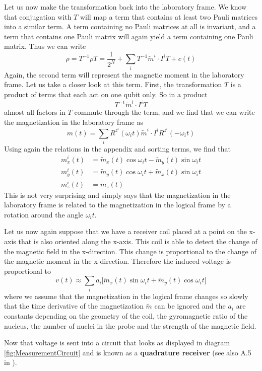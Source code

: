 \documentclass[a4paper, draft]{article}
\theoremstyle{own}
\theoremstyle{remark}
\begin{document}
Let us now make the transformation back into the laboratory frame. We know that conjugation with $T$ will map a term that contains at least two Pauli matrices into a similar term. A term containing no Pauli matrices at all is invariant, and a term that contains one Pauli matrix will again yield a term containing one Pauli matrix. Thus we can write
$$
\rho = T^{-1} \rho T = \frac{1}{2^N} +  \sum_i T^{-1} \widetilde{m}^i \cdot I^i T + c(t)
$$
Again, the second term will represent the magnetic moment in the laboratory frame. Let us take a closer look at this term. First, the transformation $T$ is a product of terms that each act on one qubit only. So in a product
$$
T^{-1} \widetilde{m}^i \cdot I^i T
$$
almost all factors in $T$ commute through the term, and we find that we can write the magnetization in the laboratory frame as
$$
m(t) = \sum_i R^{z^i}(\omega_i t ) \widetilde{m}^i \cdot I^i R^{z^i}(-\omega_i t )
$$
Using again the relations in the appendix and sorting terms, we find that
\begin{align*}
m^i_x(t) &= \widetilde{m}_x(t) \cos \omega_i t - \widetilde{m}_y(t) \sin \omega_i t \\
m^i_y(t) &= \widetilde{m}_y(t) \cos \omega_i t + \widetilde{m}_x(t) \sin \omega_i t \\
m^i_z(t) &=  \widetilde{m}_z(t)
\end{align*}
This is not very surprising and simply says that the magnetization in the laboratory frame is related to the magnetization in the logical frame by a rotation around the angle $\omega_i t$. 

Let us now again suppose that we have a receiver coil placed at a point on the x-axis that is also oriented along the x-axis. This coil is able to detect the change of the magnetic field in the x-direction. This change is proportional to the change of the magnetic moment in the x-direction. Therefore the induced voltage is proportional to
$$
v(t) \approx \sum_i a_i \big[  \widetilde{m}_x(t) \sin \omega_i t 
+ \widetilde{m}_y(t) \cos \omega_i t
\big] 
$$
where we assume that the magnetization in the logical frame changes so slowly that the time derivative of the magnetization $\widetilde{m}$ can be ignored and the $a_i$ are constants depending on the geometry of the coil, the gyromagnetic ratio of the nucleus, the number of nuclei in the probe and the strength of the magnetic field.

Now that voltage is sent into a circuit that looks as displayed in diagram \ref{fig:MeasurementCircuit} and is known as a {\bf quadrature receiver} (see also A.5 in \cite{Levitt}).
\end{document}

